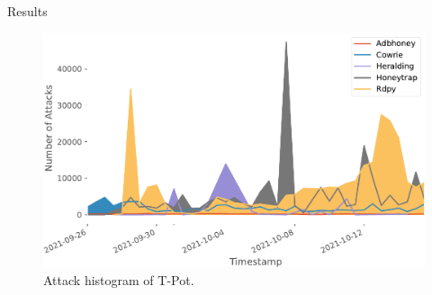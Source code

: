 \begin{frame}{Results}
    \begin{figure}
        \centering
        \includegraphics[width=\textwidth]{img/tpot-attacks-histogram.pdf}
        \caption[Attack histogram of T-Pot]{
            Attack histogram of T-Pot.
        }
        \label{tpot-overview-histogram}
    \end{figure}
\end{frame}

